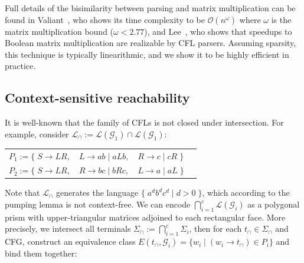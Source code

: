 \documentclass[sigplan,nonacm]{acmart}\settopmatter{printfolios=false,printccs=false,printacmref=false}
\begin{document}
Full details of the bisimilarity between parsing and matrix multiplication can be found in Valiant~\cite{valiant1975general}, who shows its time complexity to be $\mathcal{O}(n^\omega)$ where $\omega$ is the matrix multiplication bound ($\omega < 2.77$), and Lee~\cite{lee2002fast}, who shows that speedups to Boolean matrix multiplication are realizable by CFL parsers. Assuming sparsity, this technique is typically linearithmic, and we show it to be highly efficient in practice.

\subsection{Context-sensitive reachability}

It is well-known that the family of CFLs is not closed under intersection. For example, consider $\mathcal{L}_\cap := \mathcal{L}(\mathcal{G}_1) \cap \mathcal{L}(\mathcal{G}_1)$:

\begin{table}[H]
  \begin{tabular}{llll}
    $P_1 := \big\{\;S \rightarrow L R,$ & $L \rightarrow a b \mid a L b,$ & $R \rightarrow c \mid c R\;\big\}$\vspace{5pt}\\
    $P_2 := \big\{\;S \rightarrow L R,$ & $R \rightarrow b c \mid b R c,$ & $L \rightarrow a \mid a L\;\big\}$
  \end{tabular}
\end{table}

\noindent Note that $\mathcal{L}_\cap$ generates the language $\big\{\;a^d b^d c^d \mid d > 0\;\big\}$, which according to the pumping lemma is not context-free. We can encode $\bigcap_{i=1}^c \mathcal{L}(\mathcal{G}_i)$ as a polygonal prism with upper-triangular matrices adjoined to each rectangular face. More precisely, we intersect all terminals $\Sigma_\cap := \bigcap_{i=1}^c \Sigma_i$, then for each $t_\cap \in \Sigma_\cap$ and CFG, construct an equivalence class $E(t_\cap, \mathcal{G}_i) = \{ w_i \mid (w_i \rightarrow t_\cap) \in P_i\}$ and bind them together:\vspace{-5pt}
\end{document}
